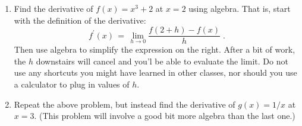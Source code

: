 \documentclass[12pt]{article}
\begin{document}
\begin{enumerate}
\item Find the derivative of $f(x) = x^3 + 2$ at $x=2$ using algebra.
  That is, start with the definition of the derivative:
  \begin{equation}
    f^\prime(x) \, = \, \lim_{h\rightarrow 0} \frac{f(2+h) - f(x)}{h}
    \;.
    \end{equation}
Then use algebra to simplify the expression on the right. After a bit
of work, the $h$ downstairs will cancel and you'l be able to evaluate
the limit. Do not use any shortcuts you might have learned in other
classes, nor should you use a calculator to plug in values of $h$.

\item Repeat the above problem, but instead find the derivative of
  $g(x) = 1/x$ at $x=3$.  (This problem will involve a good bit more
  algebra than the last one.)

  
  
\end{enumerate}
\end{document}
